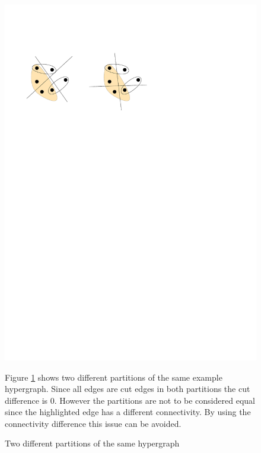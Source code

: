 \documentclass[a4paper,12pt,titlepage, BCOR7mm,headsepline]{scrbook}
\numberwithin{equation}{section}
\begin{document}
\begin{figure}[H] 

    \vspace*{-.25cm}
  \begin{center}
   \includegraphics[width=.8\textwidth]{Ipe/connexample.pdf}
  \caption{Two different partitions of the same hypergraph}\label{fig:differentpartitions} 
  \end{center}
  Figure \ref{fig:differentpartitions} shows two different partitions of the same example hypergraph. Since all edges are  cut edges in both partitions the cut difference is 0. However the partitions are not to be considered equal since the highlighted edge has 
  a different connectivity. By using the connectivity difference this issue can be avoided. 
\end{figure}
\end{document}
